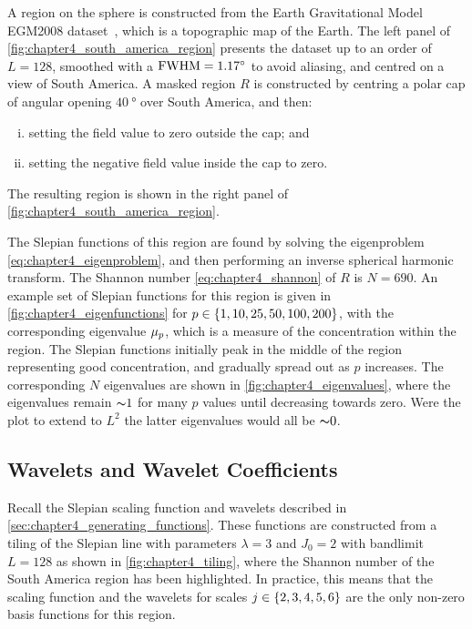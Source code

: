 A region on the sphere is constructed from the Earth Gravitational Model EGM2008 dataset~\cite{Pavlis2013}, which is a topographic map of the Earth.
The left panel of \cref{fig:chapter4_south_america_region} presents the dataset up to an order of \(L=128\), smoothed with a \(\text{FWHM}=\SI{1.17}{\degree}\) to avoid aliasing, and centred on a view of South America.
A masked region \(R\) is constructed by centring a polar cap of angular opening \(\SI{40}{\degree}\) over South America, and then:
%
\begin{enumerate}[(i),nosep,left=\parindent]
	\item setting the field value to zero outside the cap; and
	\item setting the negative field value inside the cap to zero.
\end{enumerate}
%
The resulting region is shown in the right panel of \cref{fig:chapter4_south_america_region}.



The Slepian functions of this region are found by solving the eigenproblem \cref{eq:chapter4_eigenproblem}, and then performing an inverse spherical harmonic transform.
The Shannon number \cref{eq:chapter4_shannon} of \(R\) is \(N=690\).
An example set of Slepian functions for this region is given in \cref{fig:chapter4_eigenfunctions} for \(p \in \{1, 10, 25, 50, 100, 200\}\), with the corresponding eigenvalue \({\mu}_{p}\), which is a measure of the concentration within the region.
The Slepian functions initially peak in the middle of the region representing good concentration, and gradually spread out as \(p\) increases.
The corresponding \(N\) eigenvalues are shown in \cref{fig:chapter4_eigenvalues}, where the eigenvalues remain \({\thicksim}1\) for many \(p\) values until decreasing towards zero.
Were the plot to extend to \(L^{2}\) the latter eigenvalues would all be \({\thicksim}0\).





\subsection{Wavelets and Wavelet Coefficients}\label{sec:chapter4_south_america_wavelets}

Recall the Slepian scaling function and wavelets described in \cref{sec:chapter4_generating_functions}.
These functions are constructed from a tiling of the Slepian line with parameters \(\lambda=3\) and \(J_{0}=2\) with bandlimit \(L=128\) as shown in \cref{fig:chapter4_tiling}, where the Shannon number of the South America region has been highlighted.
In practice, this means that the scaling function and the wavelets for scales \(j \in \{2, 3, 4, 5, 6\}\) are the only non-zero basis functions for this region.

